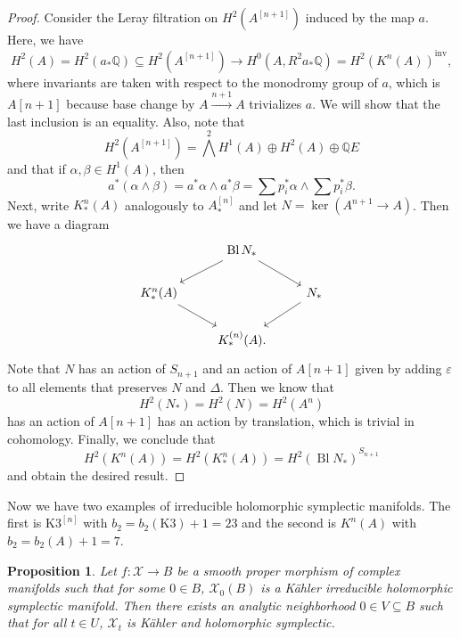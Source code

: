 \documentclass[leqno, openany]{memoir}
\newtheorem{prop}[thm]{Proposition}
\theoremstyle{definition}
\theoremstyle{remark}
\theoremstyle{plain}
\theoremstyle{definition}
\theoremstyle{remark}
\newcommand{\Q}{\mathbb{Q}}
\newcommand{\ep}{\varepsilon}
\newcommand{\mc}[1]{\mathcal{#1}}
\newcommand{\mr}[1]{\mathrm{#1}}
\DeclareMathOperator{\Bl}{Bl}
\begin{document}
\begin{proof}
    Consider the Leray filtration on $H^2(A^{[n+1]})$ induced by the map $a$. Here, we have
    \[ H^2(A) = H^2(a_* \Q) \subseteq H^2(A^{[n+1]}) \to H^0(A, R^2 a_* \Q) = {H^2(K^n(A))}^{\mr{inv}}, \]
    where invariants are taken with respect to the monodromy group of $a$, which is $A[n+1]$ because base change by $A \xrightarrow{n+1} A$ trivializes $a$. We will show that the last inclusion is an equality. Also, note that
    \[ H^2(A^{[n+1]}) = {\bigwedge}^2 H^1(A) \oplus H^2(A) \oplus \Q E \]
    and that if $\alpha, \beta \in H^1(A)$, then
    \[ a^* (\alpha \wedge \beta) = a^* \alpha \wedge a^* \beta = \sum p_i^* \alpha \wedge \sum p_i^* \beta. \]
    Next, write $K_*^n(A)$ analogously to $A_*^{[n]}$ and let $N = \ker(A^{n+1} \to A)$. Then we have a diagram
    \begin{equation*}
    \begin{tikzcd}
        & \Bl N_* \ar{dr} \ar{dl} \\
        K_*^n(A) \ar{dr} & & N_* \ar{dl} \\
        & K_*^{(n)}(A).
    \end{tikzcd}
    \end{equation*}
    Note that $N$ has an action of $S_{n+1}$ and an action of $A[n+1]$ given by adding $\ep$ to all elements that preserves $N$ and $\Delta$. Then we know that 
    \[ H^2(N_*) = H^2(N) = H^2(A^n) \]
    has an action of $A[n+1]$ has an action by translation, which is trivial in cohomology. Finally, we conclude that
    \[ H^2(K^n(A)) = H^2(K^n_*(A)) = {H^2(\Bl N_*)}^{S_{n+1}} \]
    and obtain the desired result.
\end{proof}

Now we have two examples of irreducible holomorphic symplectic manifolds. The first is $\mr{K3}^{[n]}$ with $b_2 = b_2(\mr{K3}) + 1 = 23$ and the second is $K^n(A)$ with $b_2 = b_2(A) + 1 = 7$.

\begin{prop}
    Let $f \colon \mc{X} \to B$ be a smooth proper morphism of complex manifolds such that for some $0 \in B$, $\mc{X}_0(B)$ is a K\"ahler irreducible holomorphic symplectic manifold. Then there exists an analytic neighborhood $0 \in V \subseteq B$ such that for all $t \in U$, $\mc{X}_t$ is K\"ahler and holomorphic symplectic.
\end{prop}
\end{document}
